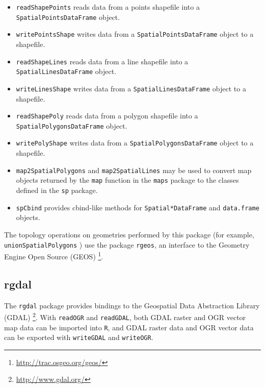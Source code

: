 \documentclass[smallroyalvopaper]{memoir}
\begin{document}
\begin{itemize}
\item \texttt{readShapePoints} reads data from a points shapefile into a \texttt{SpatialPointsDataFrame} object.

\item \texttt{writePointsShape} writes data from a \texttt{SpatialPointsDataFrame} object to a shapefile.

\item \texttt{readShapeLines} reads data from a line shapefile into a \texttt{SpatialLinesDataFrame} object.

\item \texttt{writeLinesShape} writes data from a \texttt{SpatialLinesDataFrame} object to a shapefile.

\item \texttt{readShapePoly} reads data from a polygon shapefile into a \texttt{SpatialPolygonsDataFrame} object.

\item \texttt{writePolyShape} writes data from a \texttt{SpatialPolygonsDataFrame} object to a shapefile.

\item \texttt{map2SpatialPolygons} and \texttt{map2SpatialLines} may be used to convert map objects returned by the \texttt{map} function in the \texttt{maps} package to the classes defined in the \texttt{sp} package.

\item \texttt{spCbind} provides cbind-like methods for \texttt{Spatial*DataFrame} and \texttt{data.frame} objects.
\end{itemize}

The topology operations on geometries performed by this package (for example, \texttt{unionSpatialPolygons} ) use the package \texttt{rgeos}, an interface to the Geometry Engine Open Source (GEOS) \footnote{\url{http://trac.osgeo.org/geos/}}.

\subsection{rgdal}
\label{sec:org9f24351}
\label{sec:rgdal}

The \texttt{rgdal} package \cite{Bivand.Keitt.ea2013} provides bindings to the Geospatial Data Abstraction Library (GDAL) \footnote{\url{http://www.gdal.org/}}. With \texttt{readOGR} and \texttt{readGDAL}, both GDAL raster and OGR vector map data can be imported into \texttt{R}, and GDAL raster data and OGR vector data can be exported with \texttt{writeGDAL} and \texttt{writeOGR}.
\end{document}
